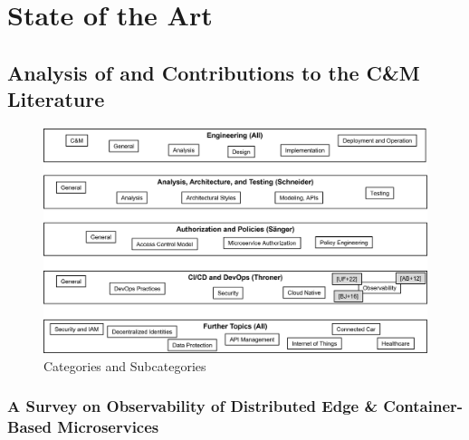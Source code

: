 \chapter{State of the Art}
\label{cha:state_of_the_art}


\section{Analysis of and Contributions to the C\&M Literature}



\begin{figure}[bth]
    \centering
    \includegraphics[width=\linewidth]{figures/literature.png}
    \caption{Categories and Subcategories}
    \label{fig:categories_subcategories}
\end{figure}

\subsection*{A Survey on Observability of Distributed Edge \& Container-Based Microservices \cite{UF+22}}

